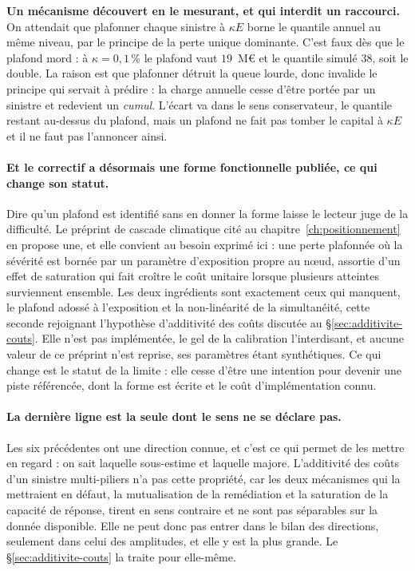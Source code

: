 \begin{attention}
\textbf{Un mécanisme découvert en le mesurant, et qui interdit un raccourci.} On attendait que
plafonner chaque sinistre à $\kappa E$ borne le quantile annuel au même niveau, par le principe
de la perte unique dominante. C'est faux dès que le plafond mord : à $\kappa = 0{,}1\,\%$ le
plafond vaut $19$~M\euro{} et le quantile simulé $38$, soit le double. La raison est que
plafonner détruit la queue lourde, donc invalide le principe qui servait à prédire :
la charge annuelle cesse d'être portée par un sinistre et redevient un \emph{cumul}. L'écart va
dans le sens conservateur, le quantile restant au-dessus du plafond, mais un plafond ne fait pas
tomber le capital à $\kappa E$ et il ne faut pas l'annoncer ainsi.
\end{attention}

\paragraph{Et le correctif a désormais une forme fonctionnelle publiée, ce qui change son
statut.} Dire qu'un plafond est \og identifié \fg{} sans en donner la forme laisse le lecteur
juge de la difficulté. Le préprint de cascade climatique cité au chapitre~\ref{ch:positionnement}
\citep{ccrn2026} en propose une, et elle convient au besoin exprimé ici : une perte plafonnée où
la sévérité est bornée par un paramètre d'exposition propre au n\oe ud, assortie d'un effet de
saturation qui fait croître le coût unitaire lorsque plusieurs atteintes surviennent ensemble.
Les deux ingrédients sont exactement ceux qui manquent, le plafond adossé à l'exposition et la
non-linéarité de la simultanéité, cette seconde rejoignant l'hypothèse d'additivité des coûts
discutée au \S\ref{sec:additivite-couts}. Elle n'est pas implémentée, le gel de la calibration
l'interdisant, et aucune valeur de ce préprint n'est reprise, ses paramètres étant
synthétiques. Ce qui change est le statut de la limite : elle cesse d'être une intention pour
devenir une piste référencée, dont la forme est écrite et le coût d'implémentation
connu.

\paragraph{La dernière ligne est la seule dont le sens ne se déclare pas.} Les six précédentes ont
une direction connue, et c'est ce qui permet de les mettre en regard : on sait laquelle sous-estime
et laquelle majore. L'additivité des coûts d'un sinistre multi-piliers n'a pas cette propriété, car
les deux mécanismes qui la mettraient en défaut, la mutualisation de la remédiation et la
saturation de la capacité de réponse, tirent en sens contraire et ne sont pas séparables sur la
donnée disponible. Elle ne peut donc pas entrer dans le bilan des directions, seulement dans celui
des amplitudes, et elle y est la plus grande. Le \S\ref{sec:additivite-couts} la traite pour
elle-même.

